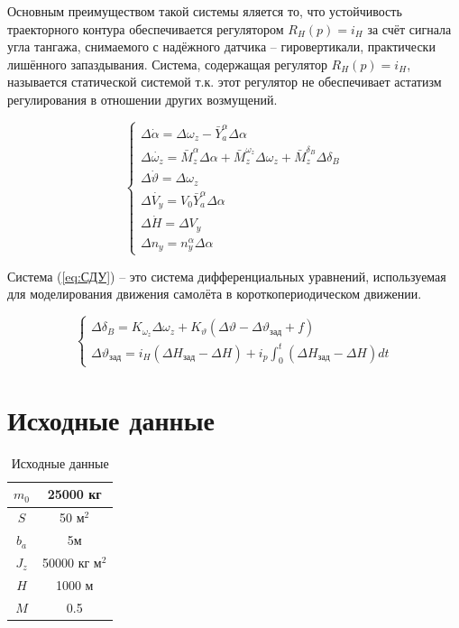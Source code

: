 Основным преимуществом такой системы яляется то, что устойчивость траекторного контура обеспечивается 
регулятором $R_H(p)=i_H$ за счёт сигнала угла тангажа, снимаемого с надёжного датчика -- гировертикали, практически лишённого запаздывания.
Система, содержащая регулятор $R_H(p)=i_H$, называется статической системой т.к. этот регулятор не обеспечивает астатизм регулирования в отношении других возмущений. 


\begin{equation}
    \begin{cases}
        \Delta\dot{\alpha}=\Delta\omega_z-\bar{Y}^\alpha_a\Delta\alpha\\
        \Delta\dot{\omega_z} = \bar{M}^\alpha_z\Delta\alpha+\bar{M}^{\omega_z}_z\Delta\omega_z+\bar{M}^{\delta_B}_z\Delta\delta_B\\
        \Delta\dot{\vartheta} = \Delta\omega_z\\
        \Delta\dot{V_y}=V_0\bar{Y}^\alpha_a\Delta\alpha\\
        \Delta\dot{H}=\Delta V_y\\
        \Delta n_y=n^\alpha_y\Delta\alpha
    \end{cases}
    \label{eq:СДУ}
\end{equation}

Система (\ref{eq:СДУ}) -- это система дифференциальных уравнений, используемая для моделирования
движения самолёта в короткопериодическом движении. 

\begin{equation}
    \begin{cases}
        \Delta\delta_B=K_{\omega_z}\Delta\omega_z+K_{\vartheta}(\Delta\vartheta-\Delta\vartheta_\text{зад}+f)\\
        \Delta\vartheta_{\text{зад}} = i_H(\Delta H_{\text{зад}}-\Delta H)+i_p\int_{0}^{t}(\Delta H_{\text{зад}}-\Delta H)dt
    \end{cases}
    \label{eq:заданные значения}
\end{equation}

\section{Исходные данные}

    \begin{table}[H]
        \centering
        \caption{Исходные данные}
        \label{tab:Исходные данные 1}
        \begin{tabular}{|c|c|}
        \hline
            $m_0$ & 25000 кг  \\ \hline
            $S$ & 50 м$^2$ \\ \hline
            $b_a$ & 5м  \\ \hline
            $J_z$ & 50000 кг м$^2$ \\ \hline
            $H$ & 1000 м  \\ \hline
            $M$ & 0.5  \\ \hline
        \end{tabular}
    \end{table}
                                
